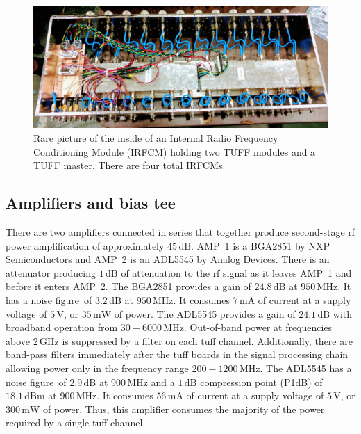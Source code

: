\begin{figure}
\centering
\includegraphics[width=1.0\textwidth]{figures/irfcm_thesis.jpg}
\caption{Rare picture of the inside of an Internal Radio Frequency Conditioning Module (IRFCM) holding two TUFF modules and a TUFF master. There are four total IRFCMs.}
\label{irfcm}
\end{figure}

\subsection{Amplifiers and bias tee} 

There are two amplifiers connected in series that together 
produce second-stage \gls{rf} power amplification of approximately $45\,\mathrm{dB}$. 
AMP~1 is a BGA2851 by NXP Semiconductors and AMP~2 is an ADL5545 by Analog Devices. 
There is an attenuator producing $1\,\mathrm{dB}$ of 
attenuation to the \gls{rf} signal as it leaves
AMP~1 and before it enters AMP~2.
The BGA2851 provides a gain of $24.8\,\mathrm{dB}$ at $950\,\mbox{MHz}$. 
It has a noise figure~of $3.2\,\mathrm{dB}$ at $950\,\mbox{MHz}$. 
It consumes $7\,\mathrm{mA}$ of current at a supply voltage of $5\,\mathrm{V}$, 
or $35\,\mathrm{mW}$ of power.
The ADL5545 provides a gain of $24.1\,\mathrm{dB}$ with broadband operation from $30-6000\,\mbox{MHz}$.
Out-of-band power at frequencies above $2\,\mbox{GHz}$ is suppressed by a filter on each \gls{tuff} channel. 
Additionally, there are band-pass 
filters immediately after the \gls{tuff} boards in the signal processing chain allowing power only in the frequency range $200 - 1200\,\mbox{MHz}$. 
The ADL5545 has a noise figure~of $2.9\,\mathrm{dB}$ at $900\,\mbox{MHz}$ 
and a $1\,\mathrm{dB}$ compression point (P1dB) of $18.1\,\mathrm{dBm}$ at $900\,\mbox{MHz}$. 
It consumes $56\,\mathrm{mA}$ of current at a supply voltage of $5\,\mathrm{V}$, or $300\,\mathrm{mW}$ of power. 
Thus, this amplifier consumes the majority of the power required by a single \gls{tuff} channel. 

